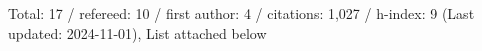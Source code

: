 Total: 17 / refereed: 10 / first author: 4 / citations: 1,027 / h-index: 9 (Last updated: 2024-11-01), List attached below